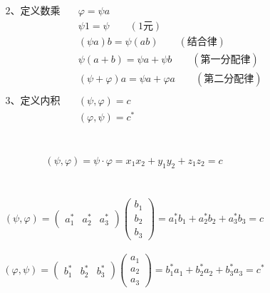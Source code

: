 \begin{frame} 
    \begin{equation*}
        \begin{split}
            \text{2、定义数乘} \quad &\varphi=\psi a\\
            &\psi 1= \psi \qquad (\text{1元})\\
            &(\psi a)b=\psi (ab) \qquad (\text{结合律})\\
            &\psi(a+b)= \psi a+ \psi b \qquad (\text{第一分配律})\\
            &(\psi+\varphi) a= \psi a +\varphi a \qquad (\text{第二分配律})\\
            ~~\\
        \text{3、定义内积} \quad &(\psi, \varphi)=c\\
        &(\varphi,\psi)=c^*
        \end{split} 
    \end{equation*}
\end{frame} 

\begin{frame} 
    \frametitle{}
    \解 ~ \[(\psi, \varphi) = \psi \cdot \varphi= x_1x_2+y_1y_2+z_1z_2=c\]
\end{frame} 

\begin{frame} 
    \frametitle{}
    \解 ~ \[(\psi, \varphi) = \begin{pmatrix}
        a_1 ^* &
        a_2 ^* &
        a_3 ^*
    \end{pmatrix}
        \begin{pmatrix}
        b_1\\
        b_2\\
        b_3
    \end{pmatrix}
    =a_1 ^* b_1 +a_2 ^* b_2 +a_3 ^* b_3
    =c 
    \]
    ~ \[(\varphi,\psi) = \begin{pmatrix}
        b_1 ^* &
        b_2 ^* &
        b_3 ^*
    \end{pmatrix}
        \begin{pmatrix}
        a_1\\
        a_2\\
        a_3
    \end{pmatrix}
    =b_1 ^* a_1 +b_2 ^* a_2 +b_3 ^* a_3
    =c^* 
    \]
\end{frame} 


